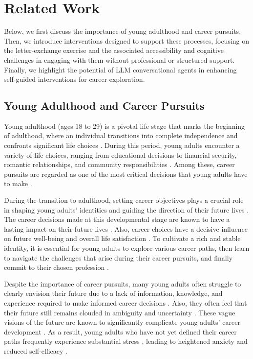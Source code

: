 \section{Related Work}
Below, we first discuss the importance of young adulthood and career pursuits. Then, we introduce interventions designed to support these processes, focusing on the letter-exchange exercise and the associated accessibility and cognitive challenges in engaging with them without professional or structured support. Finally, we highlight the potential of LLM conversational agents in enhancing self-guided interventions for career exploration.


\subsection{Young Adulthood and Career Pursuits}

Young adulthood (ages 18 to 29) is a pivotal life stage that marks the beginning of adulthood, where an individual transitions into complete independence and confronts significant life choices \cite{arnett2000emerging}. During this period, young adults encounter a variety of life choices, ranging from educational decisions to financial security, romantic relationships, and community responsibilities \cite{mitra2021life}. Among these, career pursuits are regarded as one of the most critical decisions that young adults have to make \cite{arnett2023emerging}.

During the transition to adulthood, setting career objectives plays a crucial role in shaping young adults' identities and guiding the direction of their future lives \cite{masten2004resources,schulenberg2004taking,erikson1994identity}. The career decisions made at this developmental stage are known to have a lasting impact on their future lives \cite{hlavdo2022exploring,schulenberg2004taking,arnett2000emerging}. Also, career choices have a decisive influence on future well-being and overall life satisfaction \cite{macek2015emerging}.
To cultivate a rich and stable identity, it is essential for young adults to explore various career paths, then learn to navigate the challenges that arise during their career pursuits, and finally commit to their chosen profession \cite{marcia1966development}. 

Despite the importance of career pursuits, many young adults often struggle to clearly envision their future due to a lack of information, knowledge, and experience required to make informed career decisions \cite{gaffner2002factors}. Also, they often feel that their future still remains clouded in ambiguity and uncertainty \cite{kwok2018managing}. These vague visions of the future are known to significantly complicate young adults’ career development \cite{oyserman2023possible}. As a result, young adults who have not yet defined their career paths frequently experience substantial stress \cite{boo2020career}, leading to heightened anxiety and reduced self-efficacy \cite{park2017mediation,vignoli2015career,lazarus1984stress}.

